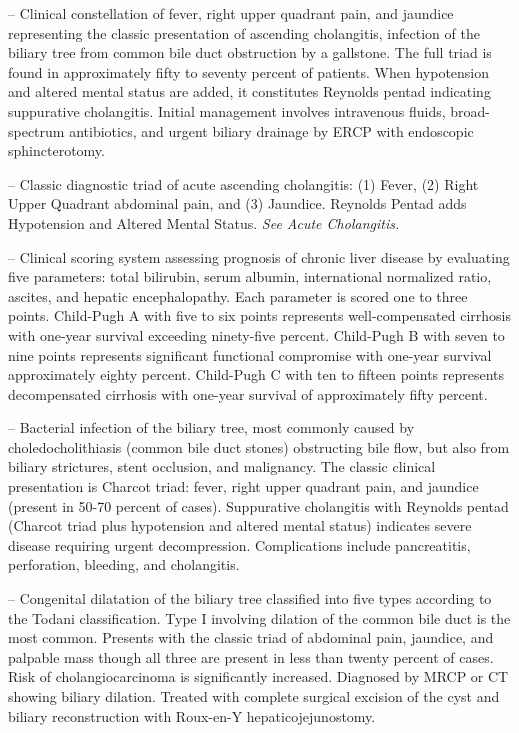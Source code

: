 -- Clinical constellation of fever, right upper quadrant pain, and jaundice representing the classic presentation of ascending cholangitis, infection of the biliary tree from common bile duct obstruction by a gallstone. The full triad is found in approximately fifty to seventy percent of patients. When hypotension and altered mental status are added, it constitutes Reynolds pentad indicating suppurative cholangitis. Initial management involves intravenous fluids, broad-spectrum antibiotics, and urgent biliary drainage by ERCP with endoscopic sphincterotomy.

-- Classic diagnostic triad of acute ascending cholangitis: (1) Fever, (2) Right Upper Quadrant abdominal pain, and (3) Jaundice. Reynolds Pentad adds Hypotension and Altered Mental Status. \textit{See Acute Cholangitis.}

-- Clinical scoring system assessing prognosis of chronic liver disease by evaluating five parameters: total bilirubin, serum albumin, international normalized ratio, ascites, and hepatic encephalopathy. Each parameter is scored one to three points. Child-Pugh A with five to six points represents well-compensated cirrhosis with one-year survival exceeding ninety-five percent. Child-Pugh B with seven to nine points represents significant functional compromise with one-year survival approximately eighty percent. Child-Pugh C with ten to fifteen points represents decompensated cirrhosis with one-year survival of approximately fifty percent.

-- Bacterial infection of the biliary tree, most commonly caused by choledocholithiasis (common bile duct stones) obstructing bile flow, but also from biliary strictures, stent occlusion, and malignancy. The classic clinical presentation is Charcot triad: fever, right upper quadrant pain, and jaundice (present in 50-70 percent of cases). Suppurative cholangitis with Reynolds pentad (Charcot triad plus hypotension and altered mental status) indicates severe disease requiring urgent decompression. Complications include pancreatitis, perforation, bleeding, and cholangitis.

-- Congenital dilatation of the biliary tree classified into five types according to the Todani classification. Type I involving dilation of the common bile duct is the most common. Presents with the classic triad of abdominal pain, jaundice, and palpable mass though all three are present in less than twenty percent of cases. Risk of cholangiocarcinoma is significantly increased. Diagnosed by MRCP or CT showing biliary dilation. Treated with complete surgical excision of the cyst and biliary reconstruction with Roux-en-Y hepaticojejunostomy.

